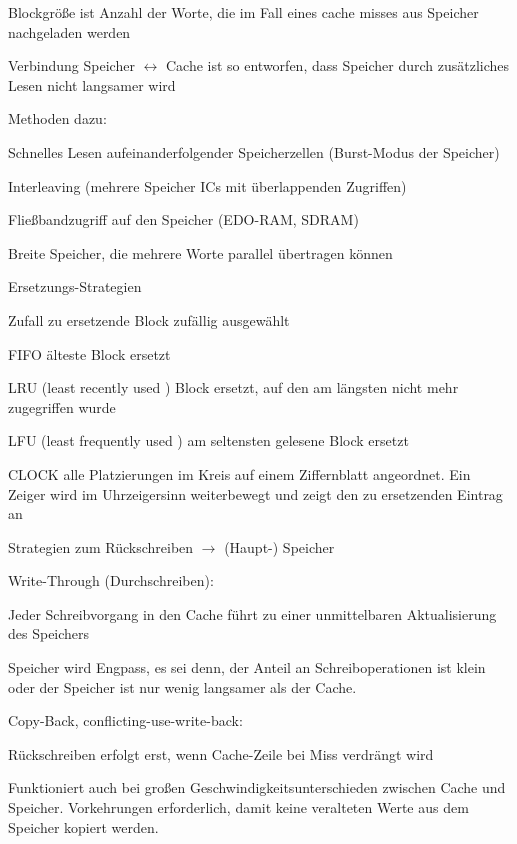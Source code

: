 \documentclass[10pt,landscape]{article}
\begin{document}
\begin{multicols}{3}
\begin{itemize*}
    \item Blockgröße ist Anzahl der Worte, die im Fall eines cache misses aus Speicher nachgeladen werden
    \item Verbindung Speicher $\leftrightarrow$ Cache ist so entworfen, dass Speicher durch zusätzliches Lesen nicht langsamer wird
    \item Methoden dazu:
    \begin{itemize*}
      \item Schnelles Lesen aufeinanderfolgender Speicherzellen (Burst-Modus der Speicher)
      \item Interleaving (mehrere Speicher ICs mit überlappenden Zugriffen)
      \item Fließbandzugriff auf den Speicher (EDO-RAM, SDRAM)
      \item Breite Speicher, die mehrere Worte parallel übertragen können
    \end{itemize*}
    \item Ersetzungs-Strategien
    \begin{description*}
      \item[Zufall] zu ersetzende Block zufällig ausgewählt
      \item[FIFO] älteste Block ersetzt
      \item[LRU] (least recently used ) Block ersetzt, auf den am längsten nicht mehr zugegriffen wurde
      \item[LFU] (least frequently used ) am seltensten gelesene Block ersetzt
      \item[CLOCK] alle Platzierungen im Kreis auf einem Ziffernblatt angeordnet. Ein Zeiger wird im Uhrzeigersinn weiterbewegt und zeigt den zu ersetzenden Eintrag an
    \end{description*}
  \end{itemize*}
  
  Strategien zum Rückschreiben $\rightarrow$ (Haupt-) Speicher
  \begin{itemize*}
    \item Write-Through (Durchschreiben):
    \item Jeder Schreibvorgang in den Cache führt zu einer unmittelbaren Aktualisierung des Speichers
    \item  Speicher wird Engpass, es sei denn, der Anteil an Schreiboperationen ist klein oder der Speicher ist nur wenig langsamer als der Cache.
    \item Copy-Back, conflicting-use-write-back:
    \item Rückschreiben erfolgt erst, wenn Cache-Zeile bei Miss verdrängt wird
    \item Funktioniert auch bei großen Geschwindigkeitsunterschieden zwischen Cache und Speicher. Vorkehrungen erforderlich, damit keine veralteten Werte aus dem Speicher kopiert werden.
  \end{itemize*}
  

\end{multicols}
\end{document}
